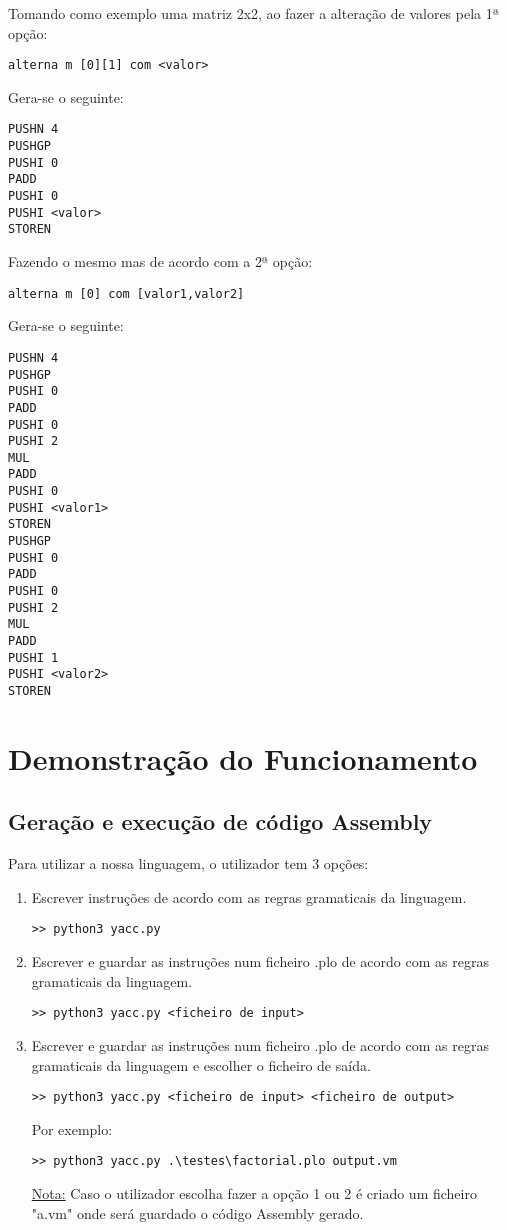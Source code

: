\documentclass[11pt,a4paper]{report}%
\begin{document}
Tomando como exemplo uma matriz 2x2, ao fazer a alteração de valores pela 1ª opção:
\begin{lstlisting}
alterna m [0][1] com <valor>
\end{lstlisting}
Gera-se o seguinte:
\begin{lstlisting}
PUSHN 4
PUSHGP
PUSHI 0
PADD
PUSHI 0
PUSHI <valor>
STOREN
\end{lstlisting}

Fazendo o mesmo mas de acordo com a 2ª opção:
\begin{lstlisting}
alterna m [0] com [valor1,valor2]
\end{lstlisting}
Gera-se o seguinte:
\begin{lstlisting}
PUSHN 4
PUSHGP
PUSHI 0
PADD
PUSHI 0
PUSHI 2
MUL
PADD
PUSHI 0
PUSHI <valor1>
STOREN
PUSHGP
PUSHI 0
PADD
PUSHI 0
PUSHI 2
MUL
PADD
PUSHI 1
PUSHI <valor2>
STOREN
\end{lstlisting}

\chapter{Demonstração do Funcionamento}
\section{Geração e  execução de código Assembly}
Para utilizar a nossa linguagem, o utilizador tem 3 opções:
\begin{enumerate}
\item Escrever instruções de acordo com as regras gramaticais da linguagem.
\begin{verbatim} 
>> python3 yacc.py
\end{verbatim}
\item Escrever e guardar as instruções num ficheiro .plo de acordo com as regras gramaticais da linguagem.
\begin{verbatim} 
>> python3 yacc.py <ficheiro de input> 
\end{verbatim}
\item Escrever e guardar as instruções num ficheiro .plo de acordo com as regras gramaticais da linguagem e escolher o ficheiro de saída.
\begin{verbatim} 
>> python3 yacc.py <ficheiro de input> <ficheiro de output>
\end{verbatim} 

Por exemplo:
\begin{verbatim} 
>> python3 yacc.py .\testes\factorial.plo output.vm
\end{verbatim} 

\underline{Nota:} Caso o utilizador escolha fazer a opção 1 ou 2 é criado um ficheiro "a.vm" onde será guardado o código Assembly gerado.
\end{enumerate}
\end{document}
